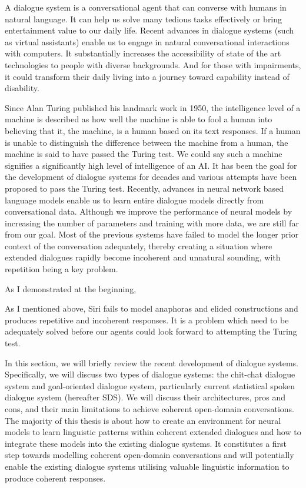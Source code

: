 \documentclass[bsc,frontabs,twoside,singlespacing,parskip,deptreport]{infthesis}     %
\begin{document}
A dialogue system is a conversational agent that can converse with humans in natural language. It can help us solve many tedious tasks effectively or bring entertainment value to our daily life. Recent advances in dialogue systems (such as virtual assistants\cite{alexa,cortana,siri}) enable us to engage in natural conversational interactions with computers. It substantially increases the accessibility of state of the art technologies to people with diverse backgrounds. And for those with impairments, it could transform their daily living into a journey toward capability instead of disability.

Since Alan Turing published his landmark work in 1950\cite{turing1950computing}, the intelligence level of a machine is described as how well the machine is able to fool a human into believing that it, the machine, is a human based on its text responses. If a human is unable to distinguish the difference between the machine from a human, the machine is said to have passed the Turing test. We could say such a machine signifies a significantly high level of intelligence of an AI. It has been the goal for the development of dialogue systems for decades and various attempts have been proposed to pass the Turing test. Recently, advances in neural network based language models enable us to learn entire dialogue models directly from conversational data. Although we improve the performance of neural models by increasing the number of parameters and training with more data, we are still far from our goal. Most of the previous systems have failed to model the longer prior context of the conversation adequately, thereby creating a situation where extended dialogues rapidly become incoherent and unnatural sounding, with repetition being a key problem. 

As I demonstrated at the beginning, 

As I mentioned above, Siri fails to model anaphoras and elided constructions and produces repetitive and incoherent responses. It is a problem which need to be adequately solved before our agents could look forward to attempting the Turing test.

In this section, we will briefly review the recent development of dialogue systems. Specifically, we will discuss two types of dialogue systems: the chit-chat dialogue system and goal-oriented dialogue system, particularly current statistical spoken dialogue system (hereafter SDS). We will discuss their architectures, pros and cons, and their main limitations to achieve coherent open-domain conversations. The majority of this thesis is about how to create an environment for neural models to learn linguistic patterns within coherent extended dialogues and how to integrate these models into the existing dialogue systems. It constitutes a first step towards modelling coherent open-domain conversations and will potentially enable the existing dialogue systems utilising valuable linguistic information to produce coherent responses.
\end{document}
